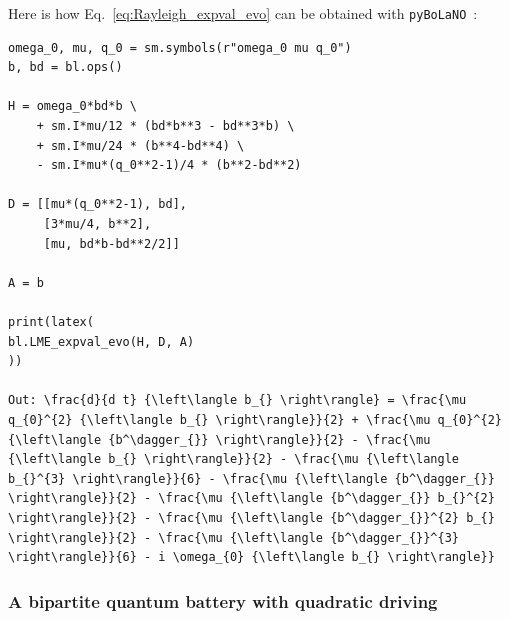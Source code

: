 \documentclass[onecolumn, 12pt, sort&compress]{elsarticle}
\newcommand{\pybolano}{\texttt{pyBoLaNO}~}
\begin{document}
Here is how Eq.~\eqref{eq:Rayleigh_expval_evo} can be obtained with \pybolano:
\begin{verbatim}
omega_0, mu, q_0 = sm.symbols(r"omega_0 mu q_0")
b, bd = bl.ops()

H = omega_0*bd*b \
    + sm.I*mu/12 * (bd*b**3 - bd**3*b) \
    + sm.I*mu/24 * (b**4-bd**4) \
    - sm.I*mu*(q_0**2-1)/4 * (b**2-bd**2)

D = [[mu*(q_0**2-1), bd],
     [3*mu/4, b**2],
     [mu, bd*b-bd**2/2]]

A = b

print(latex(
bl.LME_expval_evo(H, D, A)
))

Out: \frac{d}{d t} {\left\langle b_{} \right\rangle} = \frac{\mu q_{0}^{2} {\left\langle b_{} \right\rangle}}{2} + \frac{\mu q_{0}^{2} {\left\langle {b^\dagger_{}} \right\rangle}}{2} - \frac{\mu {\left\langle b_{} \right\rangle}}{2} - \frac{\mu {\left\langle b_{}^{3} \right\rangle}}{6} - \frac{\mu {\left\langle {b^\dagger_{}} \right\rangle}}{2} - \frac{\mu {\left\langle {b^\dagger_{}} b_{}^{2} \right\rangle}}{2} - \frac{\mu {\left\langle {b^\dagger_{}}^{2} b_{} \right\rangle}}{2} - \frac{\mu {\left\langle {b^\dagger_{}}^{3} \right\rangle}}{6} - i \omega_{0} {\left\langle b_{} \right\rangle}}
\end{verbatim}

\subsubsection{A bipartite quantum battery with quadratic driving}
\end{document}
